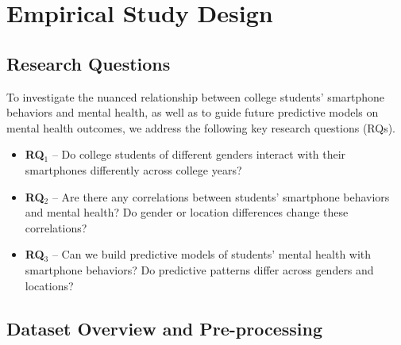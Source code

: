 \section{Empirical Study Design}\label{design}

\subsection{Research Questions}

To investigate the nuanced relationship between college students' smartphone behaviors and mental health, as well as to guide future predictive models on mental health outcomes, we address the following key research questions (RQs).
\begin{itemize}
	\item \textbf{RQ$_1$} -- Do college students of different genders interact with their smartphones differently across college years?
	\item \textbf{RQ$_2$} -- Are there any correlations between students' smartphone behaviors and mental health? Do gender or location differences change these correlations? %
	\item \textbf{RQ$_3$} -- Can we build predictive models of students' mental health with smartphone behaviors? Do predictive patterns differ across genders and locations?
\end{itemize}


\subsection{Dataset Overview and Pre-processing}\label{data}
\vspace{-2pt}

